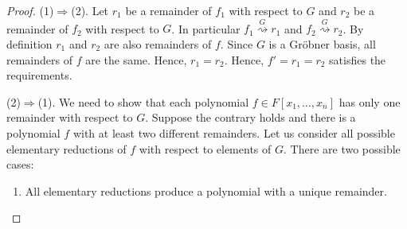 \begin{proof}
(1)$\Rightarrow$(2).
Let $r_1$ be a remainder of $f_1$ with respect to $G$ and $r_2$ be a remainder of $f_2$ with respect to $G$.
In particular $f_1 \stackrel{G}{\rightsquigarrow} r_1$ and $f_2 \stackrel{G}{\rightsquigarrow} r_2$.
By definition $r_1$ and $r_2$ are also remainders of $f$.
Since $G$ is a Gr\"obner basis, all remainders of $f$ are the same.
Hence, $r_1 = r_2$.
Hence, $f' = r_1 = r_2$ satisfies the requirements.

(2)$\Rightarrow$(1).
We need to show that each polynomial $f\in F[x_1,\ldots,x_n]$ has only one remainder with respect to $G$.
Suppose the contrary holds and there is a polynomial $f$ with at least two different remainders.
Let us consider all possible elementary reductions of $f$ with respect to elements of $G$.
There are two possible cases:
\begin{enumerate}
\item All elementary reductions produce a polynomial with a unique remainder.


\end{enumerate}
\end{proof}

